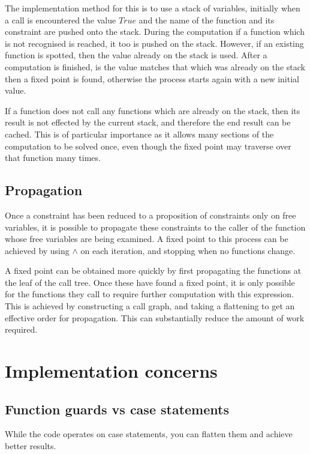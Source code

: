 \documentclass[preprint]{sigplanconf}
\begin{document}
The implementation method for this is to use a stack of variables, initially
when a call is encountered the value $True$ and the name of the function and
its constraint are pushed onto the stack. During the computation if a function
which is not recognised is reached, it too is pushed on the stack. However, if
an existing function is spotted, then the value already on the stack is used.
After a computation is finished, is the value matches that which was already on
the stack then a fixed point is found, otherwise the process starts again with
a new initial value.

If a function does not call any functions which are already on the stack, then
its result is not effected by the current stack, and therefore the end result
can be cached. This is of particular importance as it allows many sections of
the computation to be solved once, even though the fixed point may traverse
over that function many times.

\subsection{Propagation}

Once a constraint has been reduced to a proposition of constraints only on free
variables, it is possible to propagate these constraints to the caller of the
function whose free variables are being examined. A fixed point to this process
can be achieved by using $\wedge$ on each iteration, and stopping when no
functions change.

A fixed point can be obtained more quickly by first propagating the functions
at the leaf of the call tree. Once these have found a fixed point, it is only
possible for the functions they call to require further computation with this
expression. This is achieved by constructing a call graph, and taking a
flattening to get an effective order for propagation. This can substantially
reduce the amount of work required.

\section{Implementation concerns}

\subsection{Function guards vs case statements}

While the code operates on case statements, you can flatten them and achieve
better results.
\end{document}
